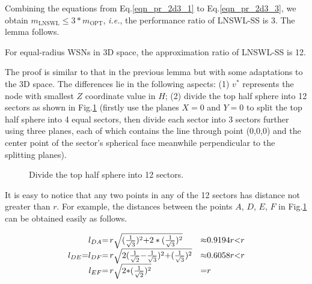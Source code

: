 \documentclass[12pt,journal,onecolumn,draftcls]{IEEEtran}
\begin{document}
\begin{IEEEproof}
Combining the equations from Eq.\eqref{eqn_pr_2d3_1} to Eq.\eqref{eqn_pr_2d3_3}, we obtain $m_\text{LNSWL}{\leq}3{*}m_\text{OPT}$, \textit{i.e.}, the performance ratio of LNSWL-SS is 3. The lemma follows.
\end{IEEEproof}

\begin{lemma}
\label{lemma_3d_ratio12}
For equal-radius WSNs in 3D space, the approximation ratio of LNSWL-SS is 12.
\end{lemma}

\begin{IEEEproof}
The proof is similar to that in the previous lemma but with some adaptations to the 3D space. The differences lie in the following aspects: (1) $v^{*}$ represents the node with smallest $Z$ coordinate value in $H$; (2) divide the top half sphere into 12 sectors as shown in Fig.\ref{fig_3d12part} (firstly use the planes $X{=}0$ and $Y{=}0$ to split the top half sphere into 4 equal sectors, then divide each sector into 3 sectors further using three planes, each of which contains the line through point (0,0,0) and the center point of the sector's spherical face meanwhile perpendicular to the splitting planes).

\begin{figure}[htb]
\caption{Divide the top half sphere into 12 sectors.}
\label{fig_3d12part}
\end{figure}

It is easy to notice that any two points in any of the 12 sectors has distance not greater than $r$. For example, the distances between the points $A$, $D$, $E$, $F$ in Fig.\ref{fig_3d12part} can be obtained easily as follows.

\begin{equation}
\label{eqn_pr_3d12_1}
\begin{array}{rll}
l_{DA}{=}&\hspace{-3mm}r\sqrt{(\frac{1}{\sqrt{3}})^2{+}2*(\frac{1}{\sqrt{3}})^2}&{\approx}0.9194r{<}r\\
l_{DE}{=}l_{DF}{=}&\hspace{-3mm}r\sqrt{2(\frac{1}{\sqrt{2}}{-}\frac{1}{\sqrt{3}})^2{+}(\frac{1}{\sqrt{3}})^2}&{\approx}0.6058r{<}r\\
l_{EF}{=}&\hspace{-3mm}r\sqrt{2{*}(\frac{1}{\sqrt{2}})^2}&{=}r
\end{array}
\end{equation}


\end{IEEEproof}
\end{document}
